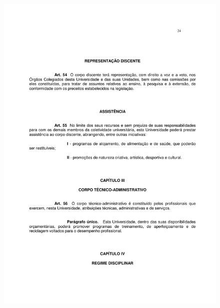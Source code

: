 \begin{figure}[p]
	\centering 
	\includegraphics[scale=0.7]{capitulos/resolucoes/cuni414/cuni414-24.pdf}
\end{figure}

